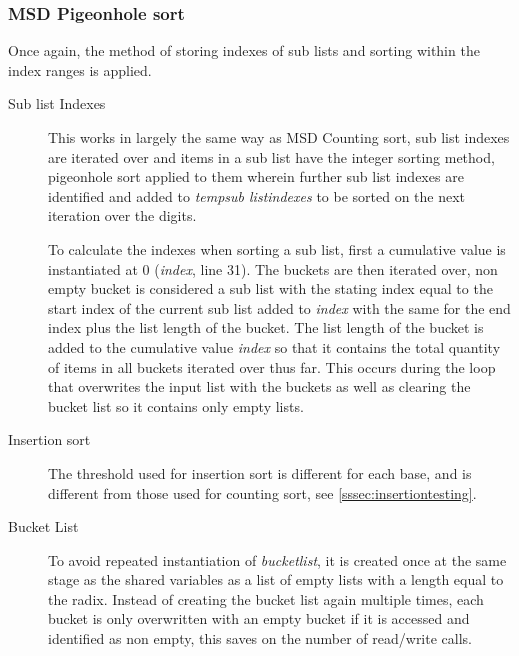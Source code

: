 \documentclass[12pt]{article}
\begin{document}
\pagebreak
\subsubsection{MSD Pigeonhole sort}
Once again, the method of storing indexes of sub lists and sorting within the index ranges is applied.
\begin{description}
	\item[Sub list Indexes] This works in largely the same way as MSD Counting sort, sub list indexes are iterated over and items in a sub list have the integer sorting method, pigeonhole sort applied to them wherein further sub list indexes are identified and added to \textit{temp\textunderscore sub list\textunderscore indexes} to be sorted on the next iteration over the digits.
	\par To calculate the indexes when sorting a sub list, first a cumulative value is instantiated at 0 (\textit{index}, line 31). The buckets are then iterated over, non empty bucket is considered a sub list with the stating index equal to the start index of the current sub list added to \textit{index} with the same for the end index plus the list length of the bucket. The list length of the bucket is added to the cumulative value \textit{index} so that it contains the total quantity of items in all buckets iterated over thus far. This occurs during the loop that overwrites the input list with the buckets as well as clearing the bucket list so it contains only empty lists.
	\item[Insertion sort] The threshold used for insertion sort is different for each base, and is different from those used for counting sort, see \ref{sssec:insertiontesting}.
	\item[Bucket List] To avoid repeated instantiation of \textit{bucket\textunderscore list}, it is created once at the same stage as the shared variables as a list of empty lists with a length equal to the radix. Instead of creating the bucket list again multiple times, each bucket is only overwritten with an empty bucket if it is accessed and identified as non empty, this saves on the number of read/write calls.
\end{description}
\end{document}
